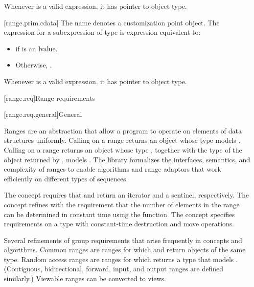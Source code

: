 \pnum
\begin{note}
Whenever  is a valid expression, it
has pointer to object type.
\end{note}

[range.prim.cdata]{}
\pnum
The name  denotes a customization point
object. The expression
 for a subexpression  of type 
is expression-equivalent to:
\begin{itemize}
\item {} if  is an lvalue.

\item Otherwise, .
\end{itemize}

\pnum
\begin{note}
Whenever  is a valid expression, it
has pointer to object type.
\end{note}

[range.req]{Range requirements}

[range.req.general]{General}

\pnum
Ranges are an abstraction that allow a \Cpp{} program
to operate on elements of data structures uniformly.
Calling  on a range returns an object
whose type models .
Calling  on a range returns an object whose type ,
together with the type  of the object returned by ,
models .
The library formalizes the interfaces, semantics, and complexity of ranges
to enable algorithms and range adaptors that work efficiently
on different types of sequences.

\pnum
The  concept requires that
 and 
return an iterator and a sentinel, respectively.
The  concept refines  with
the requirement that the number of elements in the range can be determined
in constant time using the  function.
The  concept specifies requirements on a  type
with constant-time destruction and move operations.

\pnum
Several refinements of  group requirements
that arise frequently in concepts and algorithms.
Common ranges are ranges for which
 and 
return objects of the same type.
Random access ranges are ranges for which 
returns a type that models
.
(Contiguous, bidirectional, forward, input, and output ranges
are defined similarly.)
Viewable ranges can be converted to views.

